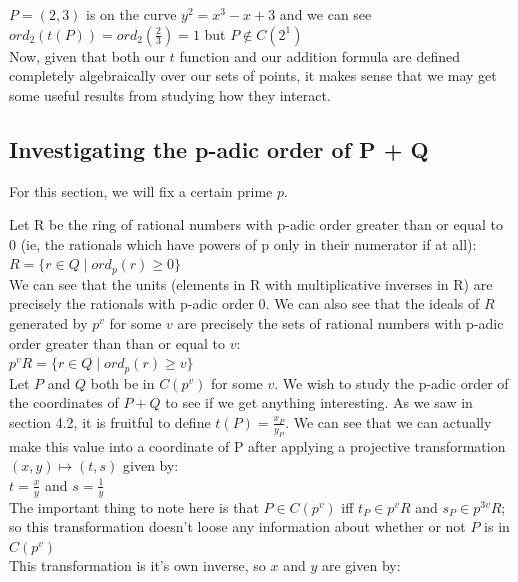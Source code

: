 \documentclass{article}
\begin{document}
$P = (2, 3)$ is on the curve $y^2 = x^3 - x + 3$ and we can see $ord_2(t(P)) = ord_2(\frac{2}{3}) = 1$ but $P \notin C(2^1)$ \\

Now, given that both our $t$ function and our addition formula are defined completely algebraically over our sets of points, it makes sense that we may get some useful results from studying how they interact.

\subsection{Investigating the p-adic order of P + Q}

For this section, we will fix a certain prime $p$.

Let R be the ring of rational numbers with p-adic order greater than or equal to 0 (ie, the rationals which have powers of p only in their numerator if at all):\\

$R = \{r \in Q \; | \; ord_p(r) \geq 0\}$\\

We can see that the units (elements in R with multiplicative inverses in R) are precisely the rationals with p-adic order 0. We can also see that the ideals of $R$ generated by $p^v$ for some $v$ are precisely the sets of rational numbers with p-adic order greater than than or equal to $v$:\\

$p^vR = \{r \in Q \; | \; ord_p(r) \geq v\}$\\

Let $P$ and $Q$ both be in $C(p^v)$ for some $v$. We wish to study the p-adic order of the coordinates of $P + Q$ to see if we get anything interesting. As we saw in section 4.2, it is fruitful to define $t(P) = \frac{x_P}{y_P}$. We can see that we can actually make this value into a coordinate of P after applying a projective transformation $(x, y) \mapsto (t, s)$ given by:\\

$t = \frac{x}{y}$ and $s = \frac{1}{y}$ \\

The important thing to note here is that $P \in C(p^v)$ iff $t_P \in p^v R$ and $s_P \in p^{3v} R$; so this transformation doesn't loose any information about whether or not $P$ is in $C(p^v)$\\

This transformation is it's own inverse, so $x$ and $y$ are given by:\\
\end{document}
